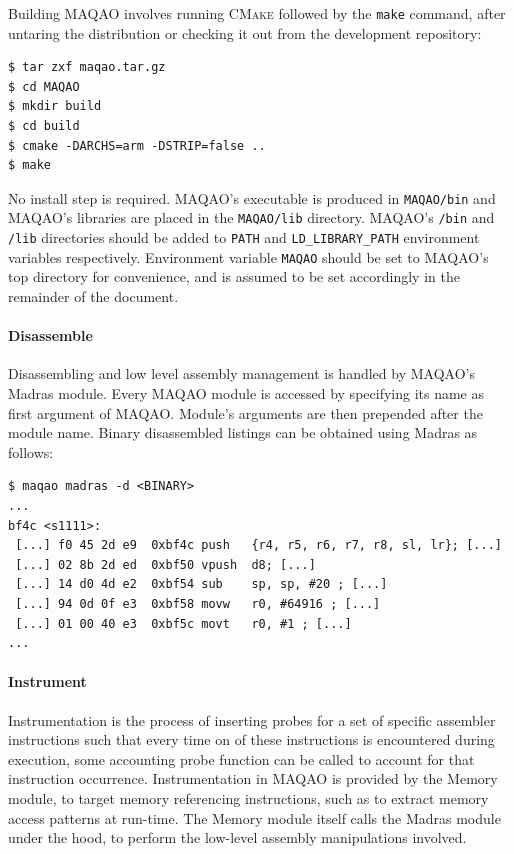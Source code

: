 \documentclass[11pt, a4paper, twoside]{montblanc2}
\def\cmake{\textsc{CMake}\xspace}
\begin{document}
Building MAQAO involves running \cmake followed by the \verb|make| command, after untaring the 
distribution or checking it out from the development repository:

\begin{verbatim}
$ tar zxf maqao.tar.gz
$ cd MAQAO
$ mkdir build
$ cd build
$ cmake -DARCHS=arm -DSTRIP=false ..
$ make
\end{verbatim}

No install step is required. MAQAO's executable is produced in \verb|MAQAO/bin| and MAQAO's 
libraries are placed in the \verb|MAQAO/lib| directory. MAQAO's \verb|/bin| and \verb|/lib|
directories should be added to \verb|PATH| and \verb|LD_LIBRARY_PATH| environment variables 
respectively. Environment variable \verb|MAQAO| should be set to MAQAO's top directory for 
convenience, and is assumed to be set accordingly in the remainder of the document.

\paragraph{Disassemble}

Disassembling and low level assembly management is handled by MAQAO's Madras module. Every MAQAO 
module is accessed by specifying its name as first argument of MAQAO. Module's arguments are then 
prepended after the module name. Binary disassembled listings can be obtained using Madras as 
follows:

\begin{verbatim}
$ maqao madras -d <BINARY>
...
bf4c <s1111>:
 [...] f0 45 2d e9  0xbf4c push   {r4, r5, r6, r7, r8, sl, lr}; [...]
 [...] 02 8b 2d ed  0xbf50 vpush  d8; [...]
 [...] 14 d0 4d e2  0xbf54 sub    sp, sp, #20 ; [...]
 [...] 94 0d 0f e3  0xbf58 movw   r0, #64916 ; [...]
 [...] 01 00 40 e3  0xbf5c movt   r0, #1 ; [...]
...
\end{verbatim}

\paragraph{Instrument}

Instrumentation is the process of inserting probes for a set of specific
assembler instructions such that every time on of these instructions is encountered
during execution, some accounting probe function can be called to account for
that instruction occurrence. Instrumentation in MAQAO is provided by the Memory module,
to target memory referencing instructions, such as to extract memory access
patterns at run-time. The Memory module itself calls the Madras module under the
hood, to perform the low-level assembly manipulations involved.
\end{document}
